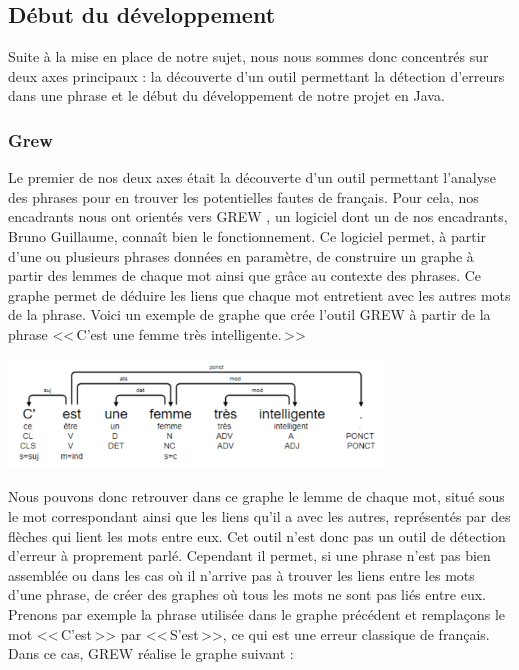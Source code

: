 \documentclass[11pt]{article}
\begin{document}
\subsection{D\'{e}but du d\'{e}veloppement}
Suite \`{a} la mise en place de notre sujet, nous nous sommes donc concentr\'{e}s sur deux axes principaux : la d\'{e}couverte d'un outil permettant la d\'{e}tection d'erreurs dans une phrase et le d\'{e}but du d\'{e}veloppement de notre projet en Java.

\subsubsection{Grew}
Le premier de nos deux axes \'{e}tait la d\'{e}couverte d'un outil permettant l'analyse des phrases pour en trouver les potentielles fautes de fran\c{c}ais. Pour cela, nos encadrants nous ont orient\'{e}s vers GREW \autocite[3]{http://grew.fr}, un logiciel dont un de nos encadrants, Bruno Guillaume, conna\^{i}t bien le fonctionnement. Ce logiciel permet, \`{a} partir d'une ou plusieurs phrases donn\'{e}es en param\`{e}tre, de construire un graphe \`{a} partir des lemmes de chaque mot ainsi que gr\^{a}ce au contexte des phrases. Ce graphe permet de d\'{e}duire les liens que chaque mot entretient avec les autres mots de la phrase. Voici un exemple de graphe que cr\'{e}e l'outil GREW \`{a} partir de la phrase <<\,C'est une femme tr\`{e}s intelligente.\,>>

\begin{center}
\includegraphics[width=10cm]{graphgrew.png} %
\end{center}

Nous pouvons donc retrouver dans ce graphe le lemme de chaque mot, situ\'{e} sous le mot correspondant ainsi que les liens qu'il a avec les autres, repr\'{e}sent\'{e}s par des fl\`{e}ches qui lient les mots entre eux. Cet outil n'est donc pas un outil de d\'{e}tection d'erreur \`{a} proprement parl\'{e}. Cependant il permet, si une phrase n'est pas bien assembl\'{e}e ou dans les cas o\`{u} il n'arrive pas \`{a} trouver les liens entre les mots d'une phrase, de cr\'{e}er des graphes o\`{u} tous les mots ne sont pas li\'{e}s entre eux. Prenons par exemple la phrase utilis\'{e}e dans le graphe pr\'{e}c\'{e}dent et rempla\c{c}ons le mot <<\,C'est\,>> par <<\,S'est\,>>, ce qui est une erreur classique de fran\c{c}ais. Dans ce cas, GREW r\'{e}alise le graphe suivant :
\end{document}
